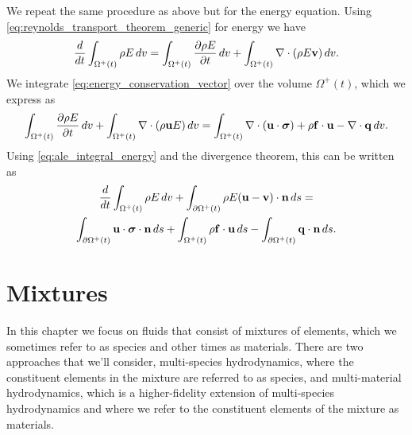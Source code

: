 \documentclass[oneside,a4paper,11pt]{report}
\begin{document}
We repeat the same procedure as above but for the energy equation. Using \cref{eq:reynolds_transport_theorem_generic} for energy we have
\begin{equation}
\label{eq:ale_integral_energy}
    \frac{d}{dt} \int_{\Omega^+(t)} \rho E \, dv = \int_{\Omega^+(t)} \frac{\partial \rho E}{\partial t} \, dv + \int_{\Omega^+(t)} \nabla \cdot (\rho E \mathbf{v} ) \, dv.
\end{equation}
We integrate \cref{eq:energy_conservation_vector} over the volume $\Omega^+(t)$, which we express as
\begin{equation*}
    \int_{\Omega^+(t)} \frac{\partial \rho E}{\partial t} \, dv + \int_{\Omega^+(t)} \nabla \cdot (\rho \mathbf{u} E) \, dv = \int_{\Omega^+(t)} \nabla \cdot (\mathbf{u} \cdot \bm \sigma) + \rho \mathbf{f} \cdot \mathbf{u} - \nabla \cdot \mathbf{q} \, dv.
\end{equation*}
Using \cref{eq:ale_integral_energy} and the divergence theorem, this can be written as
\begin{multline}
    \label{eq:ale_integral_energy_conservation}
    \frac{d}{dt} \int_{\Omega^+(t)} \rho E \, dv + \int_{\partial \Omega^+(t)} \rho E (\mathbf{u} - \mathbf{v}) \cdot \mathbf{n} \, ds = \\
    \int_{\partial \Omega^+(t)} \mathbf{u} \cdot \bm \sigma \cdot \mathbf{n} \, ds + \int_{\Omega^+(t)} \rho \mathbf{f} \cdot \mathbf{u} \, ds - \int_{\partial \Omega^+(t)} \mathbf{q} \cdot \mathbf{n} \, ds.
\end{multline}

\chapter{Mixtures}
In this chapter we focus on fluids that consist of mixtures of elements, which we sometimes refer to as species and other times as materials. There are two approaches that we'll consider, multi-species hydrodynamics, where the constituent elements in the mixture are referred to as species, and multi-material hydrodynamics, which is a higher-fidelity extension of multi-species hydrodynamics and where we refer to the constituent elements of the mixture as materials. 
\end{document}

